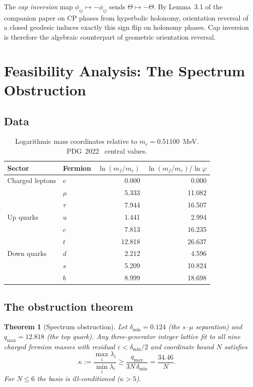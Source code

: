 ﻿\documentclass[11pt]{article}
\newtheorem{theorem}{Theorem}[section]
\begin{document}
The \emph{cap inversion} map $\phi_{ij}\mapsto-\phi_{ij}$ sends
$\Theta\mapsto-\Theta$. By Lemma~3.1 of the companion paper on CP phases
from hyperbolic holonomy, orientation reversal of a closed geodesic induces
exactly this sign flip on holonomy phases. Cap inversion is therefore the
algebraic counterpart of geometric orientation reversal.

\section{Feasibility Analysis: The Spectrum Obstruction}
\label{sec:feasibility}

\subsection{Data}

\begin{table}[h]
\centering
\begin{tabular}{llrr}
\toprule
Sector & Fermion & $\ln(m_f/m_e)$ & $\ln(m_f/m_e)/\ln\varphi$ \\
\midrule
Charged leptons & $e$ & 0.000 & 0.000 \\
 & $\mu$ & 5.333 & 11.082 \\
 & $\tau$ & 7.944 & 16.507 \\
\midrule
Up quarks & $u$ & 1.441 & 2.994 \\
 & $c$ & 7.813 & 16.235 \\
 & $t$ & 12.818 & 26.637 \\
\midrule
Down quarks & $d$ & 2.212 & 4.596 \\
 & $s$ & 5.209 & 10.824 \\
 & $b$ & 8.999 & 18.698 \\
\bottomrule
\end{tabular}
\caption{Logarithmic mass coordinates relative to $m_e=0.51100$~MeV.
PDG~2022~\cite{PDGreview} central values.}
\label{tab:masses}
\end{table}

\subsection{The obstruction theorem}

\begin{theorem}[Spectrum obstruction]\label{thm:obstruction}
Let $\delta_{\min}=0.124$ (the $s$--$\mu$ separation) and
$q_{\max}=12.818$ (the top quark). Any three-generator integer lattice fit
to all nine charged fermion masses with residual $\varepsilon<\delta_{\min}/2$
and coordinate bound $N$ satisfies
\begin{equation}\label{eq:condbound}
\kappa:=\frac{\max_i\lambda_i}{\min_i\lambda_i}
\geq\frac{q_{\max}}{3N\,\delta_{\min}}
=\frac{34.46}{N}.
\end{equation}
For $N\leq6$ the basis is ill-conditioned ($\kappa>5$).
\end{theorem}
\end{document}
